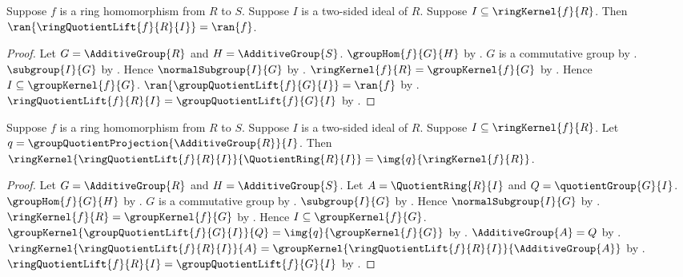 \begin{theorem}\label{ring_quotient_lift_range}
    Suppose $f$ is a ring homomorphism from $R$ to $S$.
    Suppose $I$ is a two-sided ideal of $R$.
    Suppose $I\subseteq\ringKernel{f}{R}$.
    Then $\ran{\ringQuotientLift{f}{R}{I}}=\ran{f}$.
\end{theorem}
\begin{proof}
    Let $G=\AdditiveGroup{R}$ and $H=\AdditiveGroup{S}$.
    $\groupHom{f}{G}{H}$ by
        .
    $G$ is a commutative group by
        .
    $\subgroup{I}{G}$ by
        .
    Hence $\normalSubgroup{I}{G}$ by
        .
    $\ringKernel{f}{R}=\groupKernel{f}{G}$ by .
    Hence $I\subseteq\groupKernel{f}{G}$.
    $\ran{\groupQuotientLift{f}{G}{I}}=\ran{f}$ by
        .
    $\ringQuotientLift{f}{R}{I}=\groupQuotientLift{f}{G}{I}$ by
        .
\end{proof}

\begin{theorem}\label{ring_quotient_lift_kernel}
    Suppose $f$ is a ring homomorphism from $R$ to $S$.
    Suppose $I$ is a two-sided ideal of $R$.
    Suppose $I\subseteq\ringKernel{f}{R}$.
    Let $q=\groupQuotientProjection{\AdditiveGroup{R}}{I}$.
    Then
        $\ringKernel{\ringQuotientLift{f}{R}{I}}
            {\QuotientRing{R}{I}}=
        \img{q}{\ringKernel{f}{R}}$.
\end{theorem}
\begin{proof}
    Let $G=\AdditiveGroup{R}$ and $H=\AdditiveGroup{S}$.
    Let $A=\QuotientRing{R}{I}$ and $Q=\quotientGroup{G}{I}$.
    $\groupHom{f}{G}{H}$ by
        .
    $G$ is a commutative group by
        .
    $\subgroup{I}{G}$ by
        .
    Hence $\normalSubgroup{I}{G}$ by
        .
    $\ringKernel{f}{R}=\groupKernel{f}{G}$ by .
    Hence $I\subseteq\groupKernel{f}{G}$.
    $\groupKernel{\groupQuotientLift{f}{G}{I}}{Q}=
        \img{q}{\groupKernel{f}{G}}$ by
        .
    $\AdditiveGroup{A}=Q$ by
        .
    $\ringKernel{\ringQuotientLift{f}{R}{I}}{A}=
        \groupKernel{\ringQuotientLift{f}{R}{I}}{\AdditiveGroup{A}}$ by
        .
    $\ringQuotientLift{f}{R}{I}=\groupQuotientLift{f}{G}{I}$ by
        .
\end{proof}

